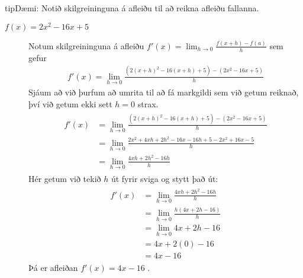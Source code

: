 \documentclass[a4paper,10pt,icelandic]{sphinxmanual}
\begin{document}
\begin{sphinxadmonition}{tip}{Dæmi:}
Notið skilgreininguna á afleiðu til að reikna afleiðu fallanna.
\begin{description}
\item[{ \(f(x) = 2x^2-16x+5\)}] \leavevmode
Notum skilgreininguna á afleiðu \(f'(x) = \lim_{h\to 0}\frac{f(x+h)-f(a)}{h}\) sem gefur
\begin{equation*}
\begin{split}f'(x) = \lim_{h\to 0} \frac{\left(2(x+h)^2 - 16(x+h) +5\right)-\left(2x^2 - 16x + 5\right)}{h}\end{split}
\end{equation*}
Sjáum að við þurfum að umrita til að fá markgildi sem við getum reiknað, því við getum ekki sett \(h= 0\) strax.
\begin{equation*}
\begin{split}\begin{aligned}
f'(x) &= \lim_{h\to 0} \frac{\left(2(x+h)^2 - 16(x+h) +5\right)-\left(2x^2 - 16x + 5\right)}{h}\\
&=\lim_{h\to 0} \frac{2x^2+4xh + 2h^2 - 16x -16h +5 -2x^2 + 16x-5}{h}\\
&= \lim_{h\to 0} \frac{4xh + 2h^2 - 16h}{h}
\end{aligned}\end{split}
\end{equation*}
Hér getum við tekið \(h\) út fyrir sviga og stytt það út:
\begin{equation*}
\begin{split}\begin{aligned}
f'(x) &= \lim_{h\to 0} \frac{4xh + 2h^2 - 16h}{h}\\
&=\lim_{h\to 0} \frac{h(4x + 2h- 16)}{h}\\
&=\lim_{h\to 0} 4x +2h - 16\\
&= 4x + 2(0) -16\\
&= 4x - 16
\end{aligned}\end{split}
\end{equation*}
Þá er afleiðan \(f'(x) = 4x-16\) .


\end{description}
\end{sphinxadmonition}
\end{document}
